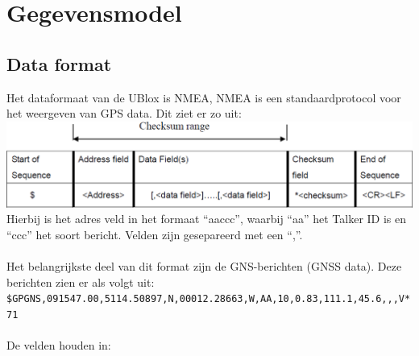 \section{Gegevensmodel}
\subsection{Data format}
Het dataformaat van de UBlox is NMEA, NMEA is een standaardprotocol voor het
weergeven van GPS data. Dit ziet er zo uit: \\
\includegraphics[width=\textwidth]{technical/nmea}
\\Hierbij is het adres veld in het formaat ``aaccc'', waarbij ``aa'' het
Talker ID is en ``ccc'' het soort bericht. Velden zijn gesepareerd met
een ``,''. 
\citep{Navspark}\\\\
Het belangrijkste deel van dit format zijn de GNS-berichten
(GNSS data). Deze berichten zien er als volgt uit:\\
\texttt{\$GPGNS,091547.00,5114.50897,N,00012.28663,W,AA,10,0.83,111.1,45.6,,,V*71}
\\\\
De velden houden in:
\\\\
